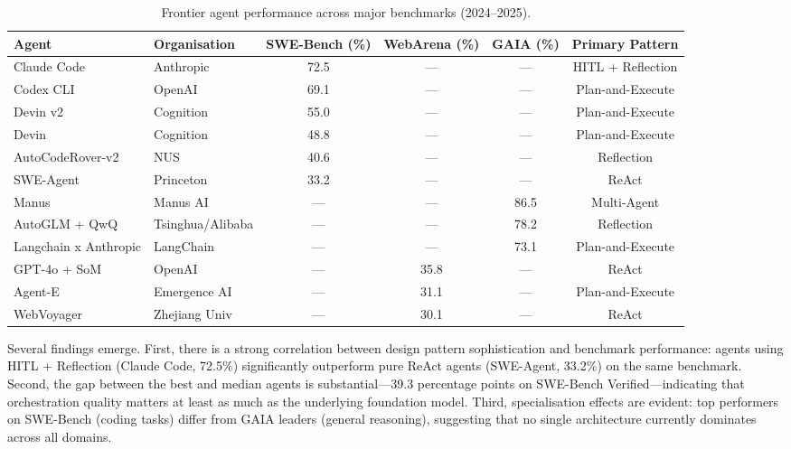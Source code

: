 \documentclass[12pt, a4paper]{article}
\begin{document}
\begin{table}[ht]
\centering
\caption{Frontier agent performance across major benchmarks (2024--2025).}
\label{tab:benchmarks}
\begin{tabular}{llcccc}
\toprule
\textbf{Agent} & \textbf{Organisation} & \textbf{SWE-Bench (\%)} & \textbf{WebArena (\%)} & \textbf{GAIA (\%)} & \textbf{Primary Pattern} \\
\midrule
Claude Code         & Anthropic      & 72.5 & ---  & ---  & HITL + Reflection \\
Codex CLI           & OpenAI         & 69.1 & ---  & ---  & Plan-and-Execute \\
Devin v2            & Cognition      & 55.0 & ---  & ---  & Plan-and-Execute \\
Devin               & Cognition      & 48.8 & ---  & ---  & Plan-and-Execute \\
AutoCodeRover-v2    & NUS            & 40.6 & ---  & ---  & Reflection \\
SWE-Agent           & Princeton      & 33.2 & ---  & ---  & ReAct \\
Manus               & Manus AI       & ---  & ---  & 86.5 & Multi-Agent \\
AutoGLM + QwQ       & Tsinghua/Alibaba & --- & ---  & 78.2 & Reflection \\
Langchain x Anthropic & LangChain    & ---  & ---  & 73.1 & Plan-and-Execute \\
GPT-4o + SoM        & OpenAI         & ---  & 35.8 & ---  & ReAct \\
Agent-E             & Emergence AI   & ---  & 31.1 & ---  & Plan-and-Execute \\
WebVoyager          & Zhejiang Univ  & ---  & 30.1 & ---  & ReAct \\
\bottomrule
\end{tabular}
\end{table}

Several findings emerge. First, there is a strong correlation between design pattern sophistication and benchmark performance: agents using HITL + Reflection (Claude Code, 72.5\%) significantly outperform pure ReAct agents (SWE-Agent, 33.2\%) on the same benchmark. Second, the gap between the best and median agents is substantial---39.3 percentage points on SWE-Bench Verified---indicating that orchestration quality matters at least as much as the underlying foundation model. Third, specialisation effects are evident: top performers on SWE-Bench (coding tasks) differ from GAIA leaders (general reasoning), suggesting that no single architecture currently dominates across all domains.
\end{document}
